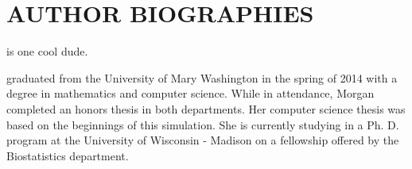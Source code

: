 \section*{AUTHOR BIOGRAPHIES}

 is one cool dude.

 graduated from the University of Mary Washington in the spring of 2014 with a degree in mathematics and computer science. While in attendance, Morgan completed an honors thesis in both departments. Her computer science thesis was based on the beginnings of this simulation. She is currently studying in a Ph. D. program at the University of Wisconsin - Madison on a fellowship offered by the Biostatistics department.

